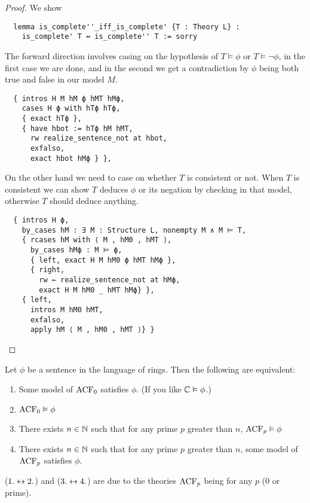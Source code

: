 \begin{proof}
  We show
\begin{lstlisting}
  lemma is_complete''_iff_is_complete' {T : Theory L} :
    is_complete' T ↔ is_complete'' T := sorry \end{lstlisting}
  The forward direction involves casing on the hypothesis of $T \vDash \phi$
  or $T \vDash \neg \phi$, in the first case we are done,
  and in the second we get a contradiction by
  $\phi$ being both true and false in our model $M$.
\begin{lstlisting}
  { intros H M hM ϕ hMT hMϕ,
    cases H ϕ with hTϕ hTϕ,
    { exact hTϕ },
    { have hbot := hTϕ hM hMT,
      rw realize_sentence_not at hbot,
      exfalso,
      exact hbot hMϕ } },
\end{lstlisting}
    On the other hand we need to case on whether $T$
    is consistent or not.
    When $T$ is consistent we can show $T$ deduces
    $\phi$ or its negation by checking in that model,
    otherwise $T$ should deduce anything.
\begin{lstlisting}
  { intros H ϕ,
    by_cases hM : ∃ M : Structure L, nonempty M ∧ M ⊨ T,
    { rcases hM with ⟨ M , hM0 , hMT ⟩,
      by_cases hMϕ : M ⊨ ϕ,
      { left, exact H M hM0 ϕ hMT hMϕ },
      { right,
        rw ← realize_sentence_not at hMϕ,
        exact H M hM0 _ hMT hMϕ} },
    { left,
      intros M hM0 hMT,
      exfalso,
      apply hM ⟨ M , hM0 , hMT ⟩} } \end{lstlisting}
\end{proof}

\begin{prop}
    Let $\phi$ be a sentence in the language of rings.
    Then the following are equivalent:
    \begin{enumerate}
        \item Some model of $\operatorname{ACF}_0$ satisfies $\phi$.
        (If you like $\mathbb{C} \vDash \phi$.)
        \item $\operatorname{ACF}_0 \vDash \phi$
        \item There exists $n \in \mathbb{N}$ such that for any prime $p$
            greater than $n$, $\operatorname{ACF}_p \vDash \phi$
        \item There exists $n \in \mathbb{N}$ such that for any prime $p$
        greater than $n$, some model of $\operatorname{ACF}_p$ satisfies $\phi$.
    \end{enumerate}
    ($1. \leftrightarrow 2.$) and ($3. \leftrightarrow 4.$) are due to the theories $\operatorname{ACF}_{p}$
    being  for any $p$ ($0$ or prime).
\end{prop}


